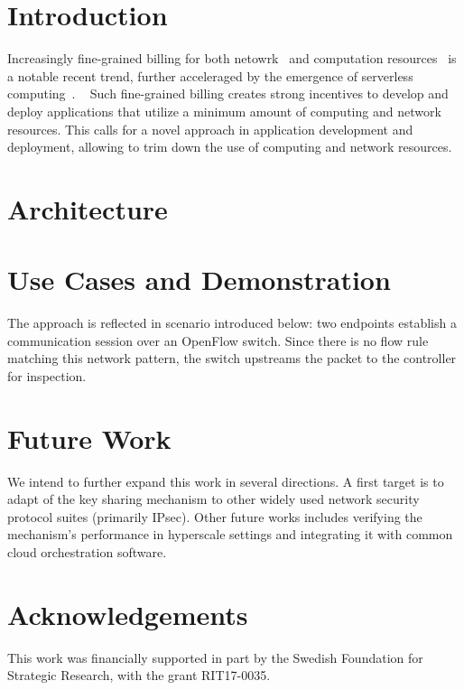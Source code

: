 \section{Introduction}
Increasingly fine-grained billing for both netowrk~\cite{thimmaraju:2020} and computation resources~\cite{zhu:2017} is a notable recent trend, further acceleraged by the emergence of serverless computing~\cite{baldini:2017}.
~\cite{zhu:2017, thimmaraju:2020}
Such fine-grained billing creates strong incentives to develop and deploy applications that utilize a minimum amount of computing and network resources.
This calls for a novel approach in application development and deployment, allowing to trim down the use of computing and network resources.

\section{Architecture}



\section{Use Cases and Demonstration}
The approach is reflected in scenario introduced below:
two endpoints establish a communication session over an OpenFlow switch.
Since there is no flow rule matching this network pattern, the switch upstreams the packet to the controller for inspection.

\section{Future Work}
We intend to further expand this work in several directions.
A first target is to adapt of the key sharing mechanism to other widely used network security protocol suites (primarily IPsec). 
Other future works includes verifying the mechanism's performance in hyperscale settings and integrating it with common cloud orchestration software.

\section{Acknowledgements}
This work was financially supported in part by the Swedish Foundation for Strategic Research, with the grant RIT17-0035.
